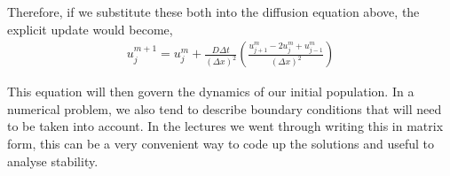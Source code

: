 \documentclass[11pt,a4paper]{report}
\theoremstyle{definition}
\begin{document}
Therefore, if we substitute these both into the diffusion equation above, the explicit update would become,
\begin{align*}
 \boxed{u_j^{m+1} = u_j^m + \frac{D \Delta t}{(\Delta x)^2} \left(\frac{u_{j+1}^m - 2u_j^m + u_{j-1}^m}{(\Delta x)^2}\right)}
\end{align*}

This equation will then govern the dynamics of our initial population. In a numerical problem, we also tend to describe boundary conditions that will need to be taken into account. In the lectures we went through writing this in matrix form, this can be a very convenient way to code up the solutions and useful to analyse stability.
\end{document}
